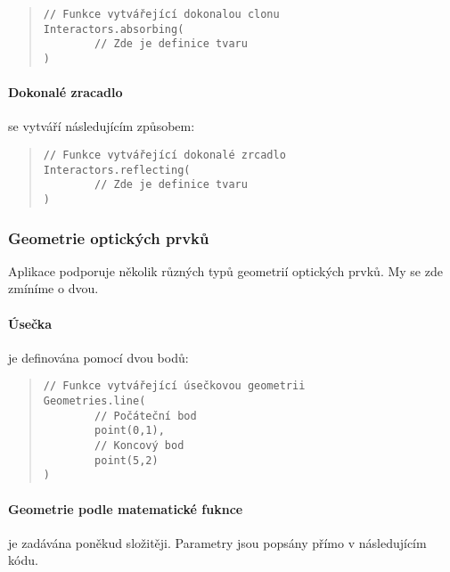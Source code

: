\begin{minipage}{\textwidth}\begin{quote}\begin{lstlisting}
// Funkce vytvářející dokonalou clonu
Interactors.absorbing(
        // Zde je definice tvaru
)
\end{lstlisting}\end{quote}\end{minipage}
    

\paragraph{Dokonalé zracadlo} se vytváří následujícím způsobem:

\begin{minipage}{\textwidth}\begin{quote}\begin{lstlisting}
// Funkce vytvářející dokonalé zrcadlo
Interactors.reflecting(
        // Zde je definice tvaru
)
\end{lstlisting}\end{quote}\end{minipage}


\subsubsection{Geometrie optických prvků}

Aplikace podporuje několik různých typů geometrií optických prvků. My se zde zmíníme o dvou.

\paragraph{Úsečka} je definována pomocí dvou bodů:

\begin{minipage}{\textwidth}\begin{quote}\begin{lstlisting}
// Funkce vytvářející úsečkovou geometrii
Geometries.line(
        // Počáteční bod
        point(0,1),
        // Koncový bod
        point(5,2)
)
\end{lstlisting}\end{quote}\end{minipage}



\paragraph{Geometrie podle matematické fuknce} je zadávána poněkud složitěji. Parametry jsou popsány přímo v následujícím kódu.


